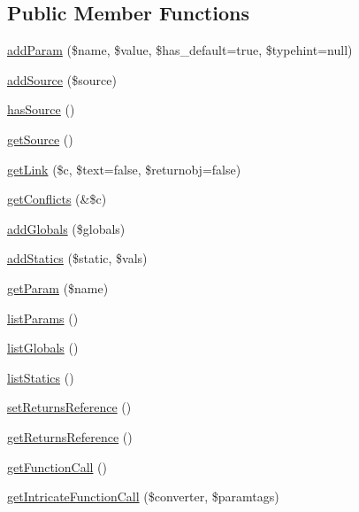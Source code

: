 \subsection*{\-Public \-Member \-Functions}
\begin{DoxyCompactItemize}
\item 
\hyperlink{classparser_function_a5973657b3fd5aedaf316f04ed150611a}{add\-Param} (\$name, \$value, \$has\-\_\-default=true, \$typehint=null)
\item 
\hyperlink{classparser_function_a28efb4011054bf61c9a4ce017927784a}{add\-Source} (\$source)
\item 
\hyperlink{classparser_function_a48be422d378408248f760a11fd42f1f1}{has\-Source} ()
\item 
\hyperlink{classparser_function_a42fdd8313c99d9c5f80219c1e192b93a}{get\-Source} ()
\item 
\hyperlink{classparser_function_a06461a82056b3b599f7011fdf0840877}{get\-Link} (\$c, \$text=false, \$returnobj=false)
\item 
\hyperlink{classparser_function_a3c0cda054b642b0209ddc1d36f1c061e}{get\-Conflicts} (\&\$c)
\item 
\hyperlink{classparser_function_ab9f100d3765ec16e6e26ade999dc0662}{add\-Globals} (\$globals)
\item 
\hyperlink{classparser_function_a7e3125fc459d422b5cc248b0b4f88c4b}{add\-Statics} (\$static, \$vals)
\item 
\hyperlink{classparser_function_a53b156a8aad0362ed2f0f68c59b5fbe2}{get\-Param} (\$name)
\item 
\hyperlink{classparser_function_a977b9c1119e70af3b160ea33922b11d8}{list\-Params} ()
\item 
\hyperlink{classparser_function_a70c1fea95f617e9f1ade3583dbe42114}{list\-Globals} ()
\item 
\hyperlink{classparser_function_ac2fe894b4c580ab277c707b12caeb808}{list\-Statics} ()
\item 
\hyperlink{classparser_function_a10b62418ef39e9c343574c33dbe22035}{set\-Returns\-Reference} ()
\item 
\hyperlink{classparser_function_a1329acd7d6b6d19aabb38f04e1b29104}{get\-Returns\-Reference} ()
\item 
\hyperlink{classparser_function_a5ef78d1a821ab72d3d3cfb761df1b0fe}{get\-Function\-Call} ()
\item 
\hyperlink{classparser_function_a8990974e1e3504ebf1ec7568ba204d75}{get\-Intricate\-Function\-Call} (\$converter, \$paramtags)
\end{DoxyCompactItemize}

